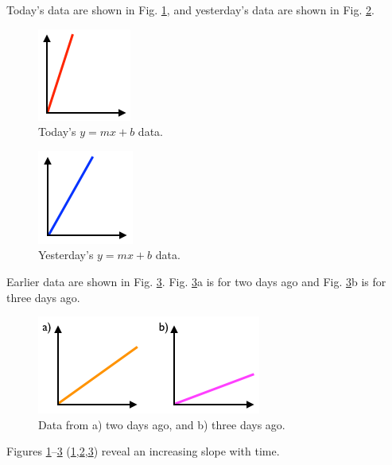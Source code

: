 Today's data are shown in Fig. \ref{fig:todays-data}, and yesterday's
data are shown in Fig. \ref{fig:yesterdays-data}.

\begin{figure}[htbp]
\centering
\includegraphics{img/todays-data.png}
\caption{Today's \(y=mx+b\) data.\label{fig:todays-data}}
\end{figure}

\begin{figure}[htbp]
\centering
\includegraphics{img/yesterdays-data.png}
\caption{Yesterday's \(y=mx+b\) data.\label{fig:yesterdays-data}}
\end{figure}

Earlier data are shown in Fig. \ref{fig:earlier-data}. Fig.
\ref{fig:earlier-data}a is for two days ago and Fig.
\ref{fig:earlier-data}b is for three days ago.

\begin{figure}[htbp]
\centering
\includegraphics{img/earlier-data.png}
\caption{Data from a) two days ago, and b) three days
ago.\label{fig:earlier-data}}
\end{figure}

Figures \ref{fig:todays-data}--\ref{fig:earlier-data}
(\ref{fig:todays-data},\ref{fig:yesterdays-data},\ref{fig:earlier-data})
reveal an increasing slope with time.
